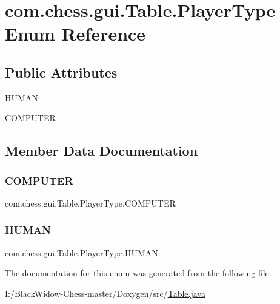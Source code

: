 \hypertarget{enumcom_1_1chess_1_1gui_1_1_table_1_1_player_type}{}\section{com.\+chess.\+gui.\+Table.\+Player\+Type Enum Reference}
\label{enumcom_1_1chess_1_1gui_1_1_table_1_1_player_type}
\subsection*{Public Attributes}
\begin{DoxyCompactItemize}
\item 
\mbox{\hyperlink{enumcom_1_1chess_1_1gui_1_1_table_1_1_player_type_a5e585f391ed18ba4aec779954d404965}{H\+U\+M\+AN}}
\item 
\mbox{\hyperlink{enumcom_1_1chess_1_1gui_1_1_table_1_1_player_type_a865f28ae9a3018cef015e6ff88e11f6f}{C\+O\+M\+P\+U\+T\+ER}}
\end{DoxyCompactItemize}


\subsection{Member Data Documentation}
\mbox{\label{enumcom_1_1chess_1_1gui_1_1_table_1_1_player_type_a865f28ae9a3018cef015e6ff88e11f6f}} 
\subsubsection{\texorpdfstring{COMPUTER}{COMPUTER}}
{\footnotesize\ttfamily com.\+chess.\+gui.\+Table.\+Player\+Type.\+C\+O\+M\+P\+U\+T\+ER}

\mbox{\label{enumcom_1_1chess_1_1gui_1_1_table_1_1_player_type_a5e585f391ed18ba4aec779954d404965}} 
\subsubsection{\texorpdfstring{HUMAN}{HUMAN}}
{\footnotesize\ttfamily com.\+chess.\+gui.\+Table.\+Player\+Type.\+H\+U\+M\+AN}



The documentation for this enum was generated from the following file\+:\begin{DoxyCompactItemize}
\item 
I\+:/\+Black\+Widow-\/\+Chess-\/master/\+Doxygen/src/\mbox{\hyperlink{_table_8java}{Table.\+java}}\end{DoxyCompactItemize}
